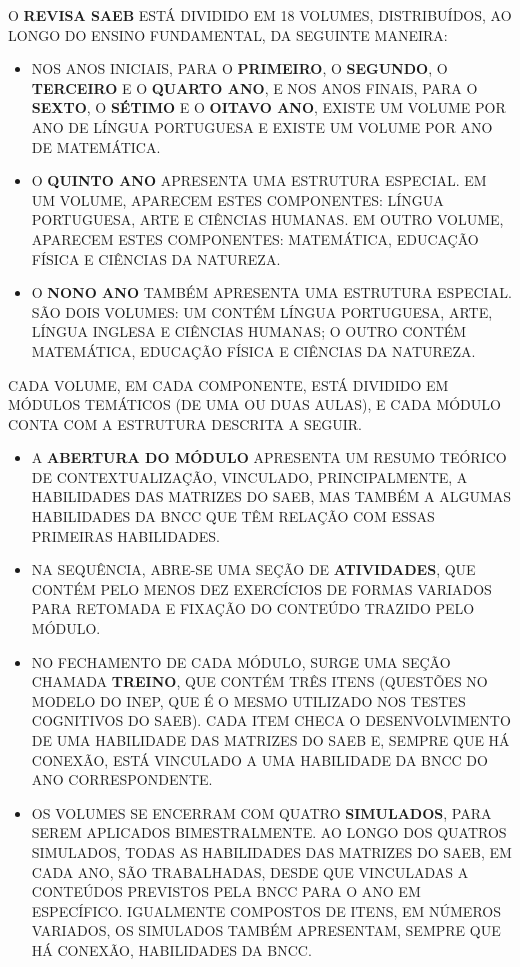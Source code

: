 O \textbf{REVISA SAEB} ESTÁ DIVIDIDO EM 18 VOLUMES, DISTRIBUÍDOS, AO
LONGO DO ENSINO FUNDAMENTAL, DA SEGUINTE MANEIRA:

\begin{itemize}
\item
  NOS ANOS INICIAIS, PARA O \textbf{PRIMEIRO}, O \textbf{SEGUNDO}, O
  \textbf{TERCEIRO} E O \textbf{QUARTO ANO}, E NOS ANOS FINAIS, PARA O
  \textbf{SEXTO}, O \textbf{SÉTIMO} E O \textbf{OITAVO ANO}, EXISTE UM
  VOLUME POR ANO DE LÍNGUA PORTUGUESA E EXISTE UM VOLUME POR ANO DE
  MATEMÁTICA.
\item
  O \textbf{QUINTO ANO} APRESENTA UMA ESTRUTURA ESPECIAL. EM UM VOLUME,
  APARECEM ESTES COMPONENTES: LÍNGUA PORTUGUESA, ARTE E CIÊNCIAS
  HUMANAS. EM OUTRO VOLUME, APARECEM ESTES COMPONENTES: MATEMÁTICA,
  EDUCAÇÃO FÍSICA E CIÊNCIAS DA NATUREZA.
\item
  O \textbf{NONO ANO} TAMBÉM APRESENTA UMA ESTRUTURA ESPECIAL. SÃO DOIS
  VOLUMES: UM CONTÉM LÍNGUA PORTUGUESA, ARTE, LÍNGUA INGLESA E CIÊNCIAS
  HUMANAS; O OUTRO CONTÉM MATEMÁTICA, EDUCAÇÃO FÍSICA E CIÊNCIAS DA
  NATUREZA.
\end{itemize}

CADA VOLUME, EM CADA COMPONENTE, ESTÁ DIVIDIDO EM MÓDULOS TEMÁTICOS (DE
UMA OU DUAS AULAS), E CADA MÓDULO CONTA COM A ESTRUTURA DESCRITA A
SEGUIR.

\begin{itemize}
\item
  A \textbf{ABERTURA DO MÓDULO} APRESENTA UM RESUMO TEÓRICO DE
  CONTEXTUALIZAÇÃO, VINCULADO, PRINCIPALMENTE, A HABILIDADES DAS
  MATRIZES DO SAEB, MAS TAMBÉM A ALGUMAS HABILIDADES DA BNCC QUE TÊM
  RELAÇÃO COM ESSAS PRIMEIRAS HABILIDADES.
\item
  NA SEQUÊNCIA, ABRE-SE UMA SEÇÃO DE \textbf{ATIVIDADES}, QUE CONTÉM
  PELO MENOS DEZ EXERCÍCIOS DE FORMAS VARIADOS PARA RETOMADA E FIXAÇÃO
  DO CONTEÚDO TRAZIDO PELO MÓDULO.
\item
  NO FECHAMENTO DE CADA MÓDULO, SURGE UMA SEÇÃO CHAMADA \textbf{TREINO},
  QUE CONTÉM TRÊS ITENS (QUESTÕES NO MODELO DO INEP, QUE É O MESMO
  UTILIZADO NOS TESTES COGNITIVOS DO SAEB). CADA ITEM CHECA O
  DESENVOLVIMENTO DE UMA HABILIDADE DAS MATRIZES DO SAEB E, SEMPRE QUE
  HÁ CONEXÃO, ESTÁ VINCULADO A UMA HABILIDADE DA BNCC DO ANO
  CORRESPONDENTE.
\item
  OS VOLUMES SE ENCERRAM COM QUATRO \textbf{SIMULADOS}, PARA SEREM
  APLICADOS BIMESTRALMENTE. AO LONGO DOS QUATROS SIMULADOS, TODAS AS
  HABILIDADES DAS MATRIZES DO SAEB, EM CADA ANO, SÃO TRABALHADAS, DESDE
  QUE VINCULADAS A CONTEÚDOS PREVISTOS PELA BNCC PARA O ANO EM
  ESPECÍFICO. IGUALMENTE COMPOSTOS DE ITENS, EM NÚMEROS VARIADOS, OS
  SIMULADOS TAMBÉM APRESENTAM, SEMPRE QUE HÁ CONEXÃO, HABILIDADES DA
  BNCC.
\end{itemize}
